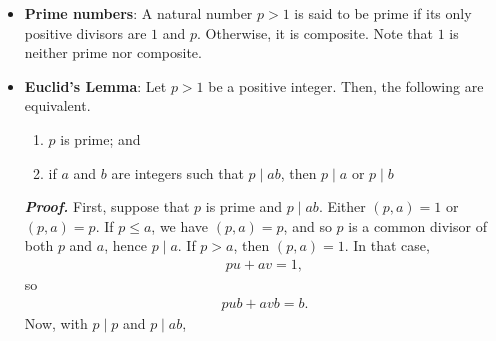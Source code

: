 \documentclass{report}
\begin{document}
\begin{itemize}
\begin{align*}
                9  &= 3(3) + 0
            .\end{align*}
            Hence, $(a,b) = 3$. Now, we can find $u,v$ such that $au + bv = 3$. We have
            \begin{align*}
                3 &= r_{1}(1) + r_{2}(-q_{3}) = 12(1) + 9(-1), \\
                  &= r_{1}(1) + (b-r_{1}q_{2})(-q_{3}) = 12(1) + (33-12(-2))(-1) \\
                  &= (a-bq_{1}) + b(-q_{3}) + r_{1}q_{2}q_{3} \\
                  &= (a-bq_{1}) + b(-q_{3}) + (a-bq_{1})q_{2}q_{3} \\
                  &= a +b(-q_{1}) + b(-q_{3}) + aq_{2}q_{3} + b(-q_{1})q_{2}q_{3} \\
                  &= a(1 + q_{2}q_{3}) + b(-q_{1} -q_{3} -q_{1}q_{2}q_{3}) \\
                  &= 45(1 + 2(1)) + 33(-1-1-1(2)(1)) = 45(3) + 33(-1-1-1(2)(1)) = 45(3) + 33(-4)
            .\end{align*}
            Hence, $u=3$, and $v  = -4$.
        \item \textbf{Prime numbers}: A natural number $p > 1$ is said to be prime if its only positive divisors are $1$ and $p$. Otherwise, it is composite. Note that $1$ is neither prime nor composite.
        \item \textbf{Euclid's Lemma}: Let $p>1$ be a positive integer. Then, the following are equivalent.
            \begin{enumerate}
                \item $p$ is prime; and
                \item if $a$ and $b$ are integers such that $p \mid ab$, then $p \mid a$ or $p\mid b$
            \end{enumerate}
            \bigbreak \noindent 
            \textbf{\textit{Proof.}} First, suppose that $p$ is prime and $p \mid ab$. Either $(p,a) = 1$ or $(p,a) = p$. If $p \leq a$, we have $(p,a) = p$, and so $p$ is a common divisor of both $p$ and $a$, hence $p\mid a$.
            \bigbreak \noindent 
            If $p > a$, then $(p,a) = 1$. In that case,
            \begin{align*}
                pu + av = 1
            ,\end{align*}
            so
            \begin{align*}
                pub + avb = b
            .\end{align*}
            Now, with $p \mid p$ and $p \mid ab$, 

\end{itemize}
\end{document}
